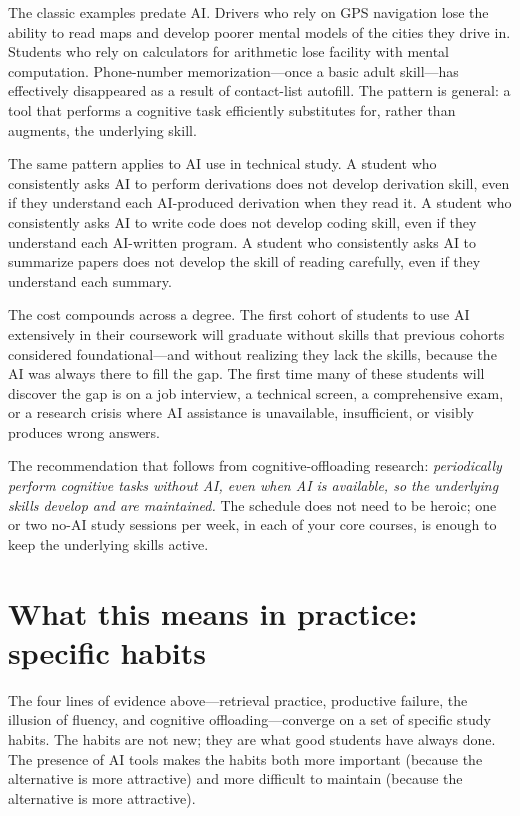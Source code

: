 \documentclass[11pt]{book}
\begin{document}
The classic examples predate AI. Drivers who rely on GPS navigation lose the ability to read maps and develop poorer mental models of the cities they drive in. Students who rely on calculators for arithmetic lose facility with mental computation. Phone-number memorization---once a basic adult skill---has effectively disappeared as a result of contact-list autofill. The pattern is general: a tool that performs a cognitive task efficiently substitutes for, rather than augments, the underlying skill.

The same pattern applies to AI use in technical study. A student who consistently asks AI to perform derivations does not develop derivation skill, even if they understand each AI-produced derivation when they read it. A student who consistently asks AI to write code does not develop coding skill, even if they understand each AI-written program. A student who consistently asks AI to summarize papers does not develop the skill of reading carefully, even if they understand each summary.

The cost compounds across a degree. The first cohort of students to use AI extensively in their coursework will graduate without skills that previous cohorts considered foundational---and without realizing they lack the skills, because the AI was always there to fill the gap. The first time many of these students will discover the gap is on a job interview, a technical screen, a comprehensive exam, or a research crisis where AI assistance is unavailable, insufficient, or visibly produces wrong answers.

The recommendation that follows from cognitive-offloading research: \emph{periodically perform cognitive tasks without AI, even when AI is available, so the underlying skills develop and are maintained.} The schedule does not need to be heroic; one or two no-AI study sessions per week, in each of your core courses, is enough to keep the underlying skills active.

\section{What this means in practice: specific habits}

The four lines of evidence above---retrieval practice, productive failure, the illusion of fluency, and cognitive offloading---converge on a set of specific study habits. The habits are not new; they are what good students have always done. The presence of AI tools makes the habits both more important (because the alternative is more attractive) and more difficult to maintain (because the alternative is more attractive).
\end{document}
